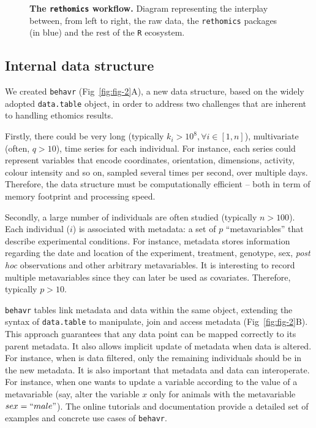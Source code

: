 \documentclass[10pt,letterpaper]{article}\usepackage[]{graphicx}\usepackage[]{color}
\begin{document}



\begin{figure}[!h]
	\caption{{\bf The \texttt{rethomics} workflow.}
		Diagram representing the interplay between, from left to right, the raw data, the \texttt{rethomics} packages (in blue) and the rest of the \texttt{R} ecosystem.}
	\label{fig:fig-1}
\end{figure}


\subsection*{Internal data structure}
We created \texttt{behavr} (Fig~\ref{fig:fig-2}A), a new data structure, based on the widely adopted \texttt{data.table} object, in order to address two challenges that are inherent to handling ethomics results.

Firstly, there could be very long (typically $k_i > 10^8, \forall i \in [1,n]$), multivariate (often, $q > 10$), time series for each individual.
For instance, each series could represent variables that encode coordinates, orientation, dimensions, activity, colour intensity and so on, sampled several times per second, over multiple days.
Therefore, the data structure must be computationally efficient -- both in term of memory footprint and processing speed. 

Secondly, a large number of individuals are often studied (typically $n > 100$).
Each individual ($i$) is associated with metadata: a set of $p$ ``metavariables'' that describe experimental conditions.
For instance, metadata stores information regarding the date and location of the experiment, treatment, genotype, sex, \emph{post hoc} observations and other arbitrary metavariables.
It is interesting to record multiple metavariables since they can later be used as covariates. 
Therefore, typically $p > 10$.

\texttt{behavr} tables link metadata and data within the same object, extending the syntax of \texttt{data.table} to manipulate, join and access metadata (Fig~\ref{fig:fig-2}B).
This approach guarantees that any data point can be mapped correctly to its parent metadata.
It also allows implicit update of metadata when data is altered.
For instance, when is data filtered, only the remaining individuals should be in the new metadata. 
It is also important that metadata and data can interoperate.
For instance, when one wants to update a variable according to the value of a metavariable (say, alter the variable $x$ only for animals with the metavariable $sex=``male"$). The online tutorials and documentation provide a detailed set of examples and concrete use cases of \texttt{behavr}. 
\end{document}
